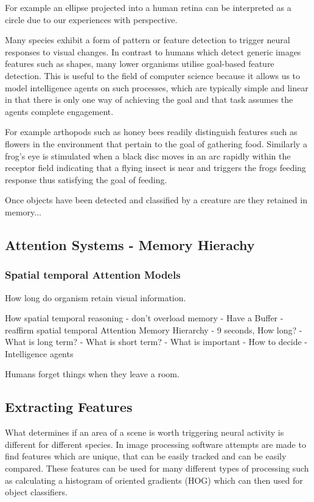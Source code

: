 \documentclass{mproj}
\begin{document}
For example an ellipse projected into a human retina can be interpreted as a circle due to our experiences with perspective. 

Many species exhibit a form of pattern or feature detection to trigger neural responses to visual changes. In contrast to humans which detect generic images features such as shapes, many lower organisms utilise goal-based feature detection. This is useful to the field of computer science because it allows us to model intelligence agents on such processes, which are typically simple and linear in that there is only one way of achieving the goal and that task assumes the agents complete engagement.

For example arthopods such as honey bees readily distinguish features such as flowers in the environment that pertain to the goal of gathering food. Similarly a frog's eye is stimulated when a black disc moves in an arc rapidly within the receptor field indicating that a flying insect is near and triggers the frogs feeding response \cite{} thus satisfying the goal of feeding.

Once objects have been detected and classified by a creature are they retained in memory...
 
\subsection{Attention Systems - Memory Hierachy}
\subsubsection{Spatial temporal Attention Models}

How long do organism retain visual information.

How spatial temporal reasoning
- don't overload memory
- Have a Buffer
- reaffirm spatial temporal Attention
Memory Hierarchy
- 9 seconds, How long?
- What is long term?
- What is short term? 
- What is important
- How to decide
- Intelligence agents

Humans forget things when they leave a room.
 
\subsection{Extracting Features}

What determines if an area of a scene is worth triggering neural activity is different for different species. In image processing software attempts are made to find features which are unique, that can be easily tracked and can be easily compared. These features can be used for many different types of processing such as calculating a histogram of oriented gradients (HOG) which can then used for object classifiers.
\end{document}
